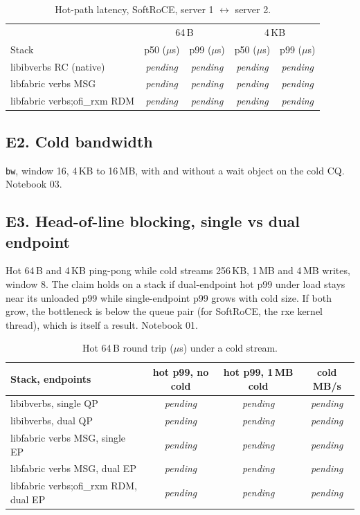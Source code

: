 \documentclass[11pt,letterpaper]{article}
\newcommand{\pend}{\textit{pending}}
\begin{document}
\begin{table}[ht]
\centering\small
\begin{tabular}{@{}lcccc@{}}
\toprule
& \multicolumn{2}{c}{64\,B} & \multicolumn{2}{c}{4\,KB} \\
Stack & p50 ($\mu$s) & p99 ($\mu$s) & p50 ($\mu$s) & p99 ($\mu$s) \\
\midrule
libibverbs RC (native) & \pend & \pend & \pend & \pend \\
libfabric verbs MSG & \pend & \pend & \pend & \pend \\
libfabric verbs;ofi\_rxm RDM & \pend & \pend & \pend & \pend \\
\bottomrule
\end{tabular}
\caption{Hot-path latency, SoftRoCE, server 1 $\leftrightarrow$ server 2.}
\end{table}

\subsection{E2. Cold bandwidth}
\texttt{bw}, window 16, 4\,KB to 16\,MB, with and without a wait object on the cold CQ. Notebook 03.

\subsection{E3. Head-of-line blocking, single vs dual endpoint}
Hot 64\,B and 4\,KB ping-pong while cold streams 256\,KB, 1\,MB and 4\,MB writes, window 8. The claim holds on a stack if dual-endpoint hot p99 under load stays near its unloaded p99 while single-endpoint p99 grows with cold size. If both grow, the bottleneck is below the queue pair (for SoftRoCE, the rxe kernel thread), which is itself a result. Notebook 01.

\begin{table}[ht]
\centering\small
\begin{tabular}{@{}lccc@{}}
\toprule
Stack, endpoints & hot p99, no cold & hot p99, 1\,MB cold & cold MB/s \\
\midrule
libibverbs, single QP & \pend & \pend & \pend \\
libibverbs, dual QP & \pend & \pend & \pend \\
libfabric verbs MSG, single EP & \pend & \pend & \pend \\
libfabric verbs MSG, dual EP & \pend & \pend & \pend \\
libfabric verbs;ofi\_rxm RDM, dual EP & \pend & \pend & \pend \\
\bottomrule
\end{tabular}
\caption{Hot 64\,B round trip ($\mu$s) under a cold stream.}
\end{table}
\end{document}
